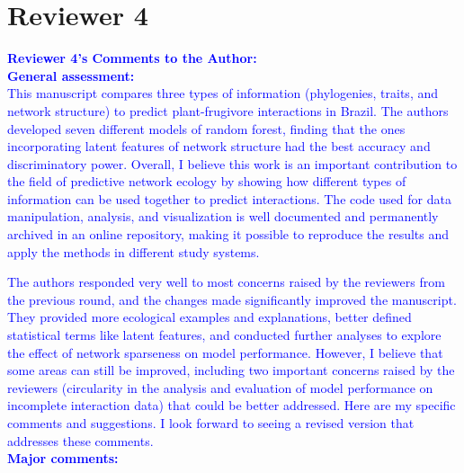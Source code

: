 \documentclass{article}
\begin{document}
\section{Reviewer 4}

\textcolor{blue}{\textbf{Reviewer 4's Comments to the Author:}} \\

\textcolor{blue}{\textbf{General assessment:}} \\

\textcolor{blue}{This manuscript compares three types of information (phylogenies, traits, and network structure) to predict plant-frugivore interactions in Brazil. The authors developed seven different models of random forest, finding that the ones incorporating latent features of network structure had the best accuracy and discriminatory power. Overall, I believe this work is an important contribution to the field of predictive network ecology by showing how different types of information can be used together to predict interactions. The code used for data manipulation, analysis, and visualization is well documented and permanently archived in an online repository, making it possible to reproduce the results and apply the methods in different study systems.}

\textcolor{blue}{The authors responded very well to most concerns raised by the reviewers from the previous round, and the changes made significantly improved the manuscript. They provided more ecological examples and explanations, better defined statistical terms like latent features, and conducted further analyses to explore the effect of network sparseness on model performance. However, I believe that some areas can still be improved, including two important concerns raised by the reviewers (circularity in the analysis and evaluation of model performance on incomplete interaction data) that could be better addressed. Here are my specific comments and suggestions. I look forward to seeing a revised version that addresses these comments.} \\
 
\textcolor{blue}{\textbf{Major comments:}} \\
\end{document}
